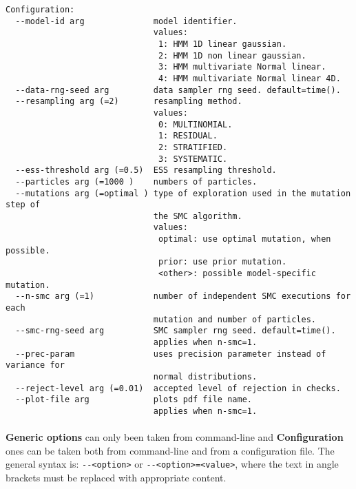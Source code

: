 \begin{verbatim}
Configuration:
  --model-id arg              model identifier.
                              values:
                               1: HMM 1D linear gaussian.
                               2: HMM 1D non linear gaussian.
                               3: HMM multivariate Normal linear.
                               4: HMM multivariate Normal linear 4D.
  --data-rng-seed arg         data sampler rng seed. default=time().
  --resampling arg (=2)       resampling method.
                              values:
                               0: MULTINOMIAL.
                               1: RESIDUAL.
                               2: STRATIFIED.
                               3: SYSTEMATIC.
  --ess-threshold arg (=0.5)  ESS resampling threshold.
  --particles arg (=1000 )    numbers of particles.
  --mutations arg (=optimal ) type of exploration used in the mutation step of 
                              the SMC algorithm.
                              values:
                               optimal: use optimal mutation, when possible.
                               prior: use prior mutation.
                               <other>: possible model-specific mutation.
  --n-smc arg (=1)            number of independent SMC executions for each 
                              mutation and number of particles.
  --smc-rng-seed arg          SMC sampler rng seed. default=time().
                              applies when n-smc=1.
  --prec-param                uses precision parameter instead of variance for 
                              normal distributions.
  --reject-level arg (=0.01)  accepted level of rejection in checks.
  --plot-file arg             plots pdf file name.
                              applies when n-smc=1.
\end{verbatim}

\paragraph{}
\textbf{Generic options} can only been taken from command-line and \textbf{Configuration} ones can be taken both from command-line and from a configuration file. The general syntax is: \verb!--<option>! or \verb!--<option>=<value>!, where the text in angle brackets must be replaced with appropriate content.

